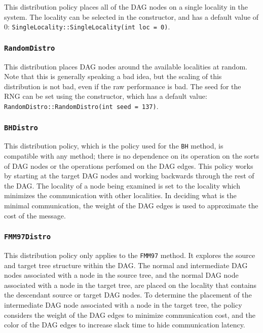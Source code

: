 This distribution policy places all of the DAG nodes on a single locality in
the system. The locality can be selected in the constructor, and has a default
value of 0: \texttt{SingleLocality::SingleLocality(int loc = 0)}.

\subsubsection{\texttt{RandomDistro}}

This distribution places DAG nodes around the available localities at random.
Note that this is generally speaking a bad idea, but the scaling of this
distribution is not bad, even if the raw performance is bad. The seed for the
RNG can be set using the constructor, which has a default value:
\texttt{RandomDistro::RandomDistro(int seed = 137)}.

\subsubsection{\texttt{BHDistro}}

This distribution policy, which is the policy used for the \texttt{BH} method,
is compatible with any method; there is no dependence on its operation on the
sorts of DAG nodes or the operations perfomed on the DAG edges. This policy
works by starting at the target DAG nodes and working backwards through the
rest of the DAG. The locality of a node being examined is set to the locality
which minimizes the communication with other localities. In deciding what is
the minimal communication, the weight of the DAG edges is used to approximate
the cost of the message.

\subsubsection{\texttt{FMM97Distro}}

This distribution policy only applies to the \texttt{FMM97} method. It explores
the source and target tree structure within the DAG. The normal and intermediate
DAG nodes associated with a node in the source tree, and the normal DAG node
associated with a node in the target tree, are placed on the locality that
contains the descendant source or target DAG nodes. To determine the placement
of the intermediate DAG node associated with a node in the target tree, the
policy considers the weight of the DAG edges to minimize communication cost, and
the color of the DAG edges to increase slack time to hide communication
latency.

